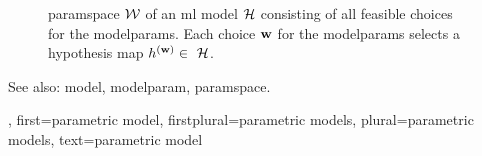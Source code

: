 {{\begin{figure}[H]
\begin{center}
			\end{center} 
		\caption{\Gls{paramspace} $\mathcal{W}$ of an \gls{ml} \gls{model} $\mathcal{H}$ consisting of all 
			feasible choices for the \glspl{modelparam}. Each choice ${\bf w}$ for the \glspl{modelparam} 
			selects a \gls{hypothesis} \gls{map} $\hypothesis^{(\weights)} \in \hypospace$.
			\label{fig_param_model_dict}} 
		\end{figure}
		See also: \gls{model}, \gls{modelparam}, \gls{paramspace}.},
	first={parametric model},
	firstplural={parametric models},
	plural={parametric models},
	text={parametric model}
}

